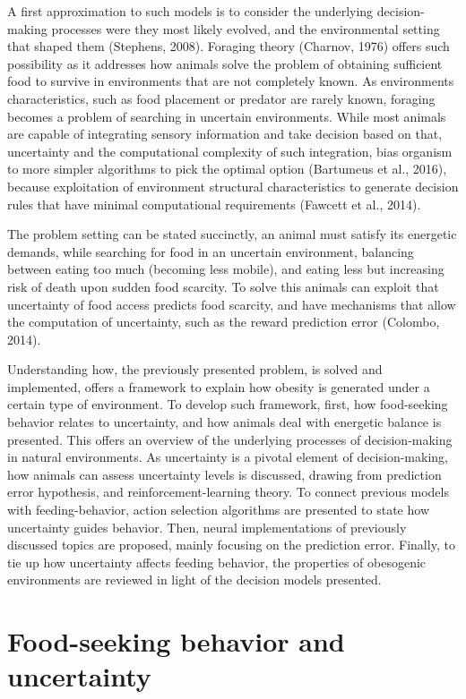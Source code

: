 \documentclass[
]{/home/nicoluarte/Downloads/templates/PNAS-template-main.tex}
\begin{document}
A first approximation to such models is to consider the underlying
decision-making processes were they most likely evolved, and the
environmental setting that shaped them (Stephens, 2008). Foraging theory
(Charnov, 1976) offers such possibility as it addresses how animals
solve the problem of obtaining sufficient food to survive in
environments that are not completely known. As environments
characteristics, such as food placement or predator are rarely known,
foraging becomes a problem of searching in uncertain environments. While
most animals are capable of integrating sensory information and take
decision based on that, uncertainty and the computational complexity of
such integration, bias organism to more simpler algorithms to pick the
optimal option (Bartumeus et al., 2016), because exploitation of
environment structural characteristics to generate decision rules that
have minimal computational requirements (Fawcett et al., 2014).

The problem setting can be stated succinctly, an animal must satisfy its
energetic demands, while searching for food in an uncertain environment,
balancing between eating too much (becoming less mobile), and eating
less but increasing risk of death upon sudden food scarcity. To solve
this animals can exploit that uncertainty of food access predicts food
scarcity, and have mechanisms that allow the computation of uncertainty,
such as the reward prediction error (Colombo, 2014).

Understanding how, the previously presented problem, is solved and
implemented, offers a framework to explain how obesity is generated
under a certain type of environment. To develop such framework, first,
how food-seeking behavior relates to uncertainty, and how animals deal
with energetic balance is presented. This offers an overview of the
underlying processes of decision-making in natural environments. As
uncertainty is a pivotal element of decision-making, how animals can
assess uncertainty levels is discussed, drawing from prediction error
hypothesis, and reinforcement-learning theory. To connect previous
models with feeding-behavior, action selection algorithms are presented
to state how uncertainty guides behavior. Then, neural implementations
of previously discussed topics are proposed, mainly focusing on the
prediction error. Finally, to tie up how uncertainty affects feeding
behavior, the properties of obesogenic environments are reviewed in
light of the decision models presented.

\hypertarget{food-seeking-behavior-and-uncertainty}{%
\section{Food-seeking behavior and
uncertainty}\label{food-seeking-behavior-and-uncertainty}}
\end{document}

